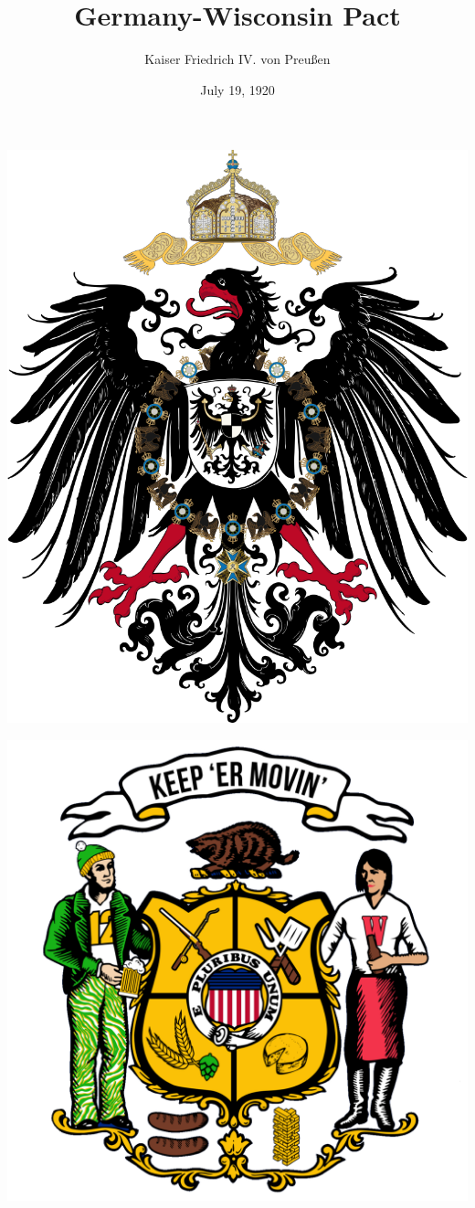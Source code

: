 \documentclass{article}
\title{Germany-Wisconsin Pact}
\author{Kaiser Friedrich IV. von Preußen}
\date{July 19, 1920}
\begin{document}
\maketitle
\begin{center}
    \begin{minipage}{0.45\textwidth}
        \centering
        \includegraphics[scale=.15]{dr_wappen}
    \end{minipage}
    \hfill
    \begin{minipage}{0.45\textwidth}
        \centering
        \includegraphics[scale=.10]{wi_wappen.png}

\end{minipage}
\end{center}
\end{document}
